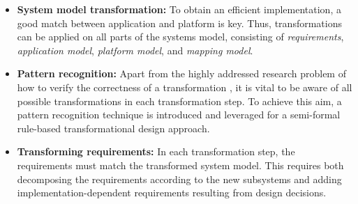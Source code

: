 \begin{itemize}[leftmargin=*]
	\setlength{\parskip}{1pt} 
	\setlength{\itemsep}{0pt plus 0pt}
 \item \textbf{System model transformation:} To obtain an efficient implementation, a good match between application and platform is key. Thus, transformations can be applied on all parts of the systems model, consisting of \emph{requirements}, \emph{application model}, \emph{platform model}, and \emph{mapping model}.
 \item \textbf{Pattern recognition:} Apart from the highly addressed research problem of how to verify the correctness of a transformation
   \cite{broy2012specification, nuzzo2015platform}, it is vital to be aware of all possible transformations in each transformation step. To achieve this aim, a pattern recognition technique is introduced and leveraged for a semi-formal rule-based transformational design approach.
    \item \textbf{Transforming requirements:} In each transformation step, the requirements must match the transformed system model. This requires both decomposing the requirements according to the new subsystems and adding implementation-dependent requirements resulting from design decisions.
\end{itemize}

